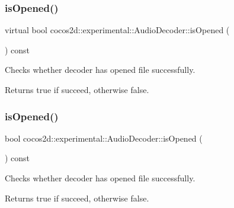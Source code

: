 \subsubsection{\texorpdfstring{is\+Opened()}{isOpened()}\hspace{0.1cm}{\footnotesize\ttfamily [1/2]}}
{\footnotesize\ttfamily virtual bool cocos2d\+::experimental\+::\+Audio\+Decoder\+::is\+Opened (\begin{DoxyParamCaption}{ }\end{DoxyParamCaption}) const\hspace{0.3cm}{\ttfamily [virtual]}}



Checks whether decoder has opened file successfully. 

\begin{DoxyReturn}{Returns}
true if succeed, otherwise false. 
\end{DoxyReturn}
\mbox{\label{classcocos2d_1_1experimental_1_1AudioDecoder_a3989ba6f09b6f772a75d5d3255174286}} 
\subsubsection{\texorpdfstring{is\+Opened()}{isOpened()}\hspace{0.1cm}{\footnotesize\ttfamily [2/2]}}
{\footnotesize\ttfamily bool cocos2d\+::experimental\+::\+Audio\+Decoder\+::is\+Opened (\begin{DoxyParamCaption}{ }\end{DoxyParamCaption}) const}



Checks whether decoder has opened file successfully. 

\begin{DoxyReturn}{Returns}
true if succeed, otherwise false. 
\end{DoxyReturn}
\mbox{\label{classcocos2d_1_1experimental_1_1AudioDecoder_a27747e5f9671a16852997fe852e28e71}} 

